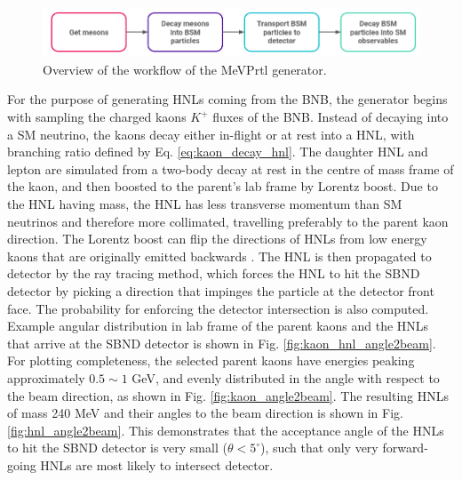 \begin{figure}[htbp!] 
\centering    
\includegraphics[width=1.0\textwidth]{MeVPrtl_Workflow}
\caption[MeVPrtl_Workflow]{
Overview of the workflow of the MeVPrtl generator.
}
\label{fig:MeVPrtl_Workflow}
\end{figure}

For the purpose of generating HNLs coming from the BNB, the generator begins with sampling the charged kaons $K^{+}$ fluxes of the BNB.
Instead of decaying into a SM neutrino, the kaons decay either in-flight or at rest into a HNL, with branching ratio defined by Eq. \ref{eq:kaon_decay_hnl}.
The daughter HNL and lepton are simulated from a two-body decay at rest in the centre of mass frame of the kaon, and then boosted to the parent's lab frame by Lorentz boost.
Due to the HNL having mass, the HNL has less transverse momentum than SM neutrinos and therefore more collimated, travelling preferably to the parent kaon direction.
The Lorentz boost can flip the directions of HNLs from low energy kaons that are originally emitted backwards \cite{DavidePhD}.
The HNL is then propagated to detector by the ray tracing method, which forces the HNL to hit the SBND detector by picking a direction that impinges the particle at the detector front face.
The probability for enforcing the detector intersection is also computed.
Example angular distribution in lab frame of the parent kaons and the HNLs that arrive at the SBND detector is shown in Fig. \ref{fig:kaon_hnl_angle2beam}.
For plotting completeness, the selected parent kaons have energies peaking approximately $0.5\sim1$ GeV, and evenly distributed in the angle with respect to the beam direction, as shown in Fig. \ref{fig:kaon_angle2beam}.
The resulting HNLs of mass 240 MeV and their angles to the beam direction is shown in Fig. \ref{fig:hnl_angle2beam}.
This demonstrates that the acceptance angle of the HNLs to hit the SBND detector is very small ($\theta < 5^\circ$), such that only very forward-going HNLs are most likely to intersect detector.

